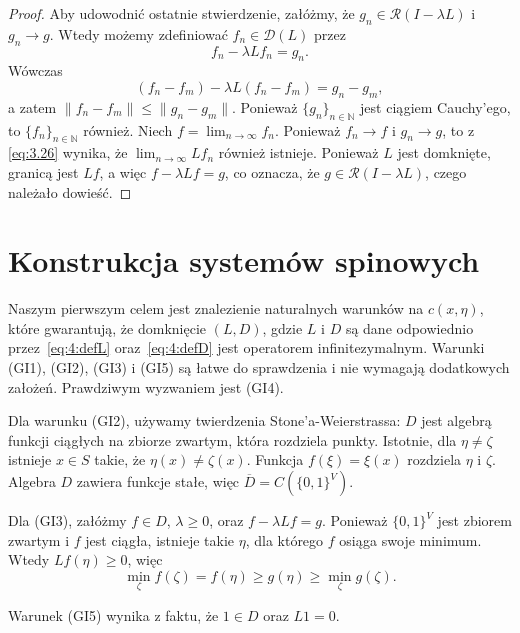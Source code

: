 \documentclass{article}
\begin{document}
\begin{proof}
	Aby udowodnić ostatnie stwierdzenie, załóżmy, że 
	$g_n \in \mathcal{R}(I - \lambda L)$ i $g_n \to g$. 
	Wtedy możemy zdefiniować $f_n \in \mathcal{D}(L)$ przez
	\begin{equation}\label{eq:3.26}
		f_n - \lambda L f_n = g_n.
	\end{equation}
	Wówczas
	\[
		(f_n - f_m) - \lambda L (f_n - f_m) = g_n - g_m,
	\]
	a zatem $\| f_n - f_m \| \leq \| g_n - g_m \|$. 
	Ponieważ $\{g_n\}_{n \in \mathbb{N}}$ jest ciągiem Cauchy’ego, 
	to $\{f_n\}_{n \in \mathbb{N}}$ również. 
	Niech $f = \lim_{n \to \infty} f_n$. 
	Ponieważ $f_n \to f$ i $g_n \to g$, to z \eqref{eq:3.26} wynika, 
	że $\lim_{n \to \infty} L f_n$ również istnieje. 
	Ponieważ $L$ jest domknięte, granicą jest $L f$, a więc $f - \lambda L f = g$, 
	co oznacza, że $g \in \mathcal{R}(I - \lambda L)$, czego należało dowieść.
\end{proof}




\section{Konstrukcja systemów spinowych}

	Naszym pierwszym celem jest znalezienie naturalnych warunków na $c(x, \eta)$, 
	które gwarantują, że domknięcie $(L,D)$, gdzie $L$ i $D$ są dane odpowiednio
	przez~\eqref{eq:4:defL} oraz~\eqref{eq:4:defD} jest operatorem infinitezymalnym. 
	Warunki (GI1), (GI2), (GI3) i (GI5) są łatwe do sprawdzenia i nie wymagają dodatkowych 
	założeń. Prawdziwym wyzwaniem jest (GI4).

	Dla warunku (GI2), używamy twierdzenia Stone’a-Weierstrassa: 
	$D$ jest algebrą funkcji ciągłych na zbiorze zwartym, 
	która rozdziela punkty. Istotnie, dla $\eta \neq \zeta$ istnieje $x \in S$ takie, 
	że $\eta(x) \neq \zeta(x)$. Funkcja $f(\xi) = \xi(x)$ rozdziela 
	$\eta$ i $\zeta$. Algebra $D$ zawiera funkcje stałe, 
	więc $\overline{D} = C(\{0,1\}^V)$. 

	Dla (GI3), załóżmy $f \in D$, $\lambda \geq 0$, oraz $f - \lambda Lf = g$. 
	Ponieważ $\{0,1\}^V$ jest zbiorem zwartym i $f$ jest ciągła, 
	istnieje takie $\eta$, dla którego $f$ osiąga swoje minimum. 
	Wtedy $Lf(\eta) \geq 0$, więc
	\[
		\min_\zeta f(\zeta) 
		= f(\eta) \geq g(\eta) 
		\geq \min_\zeta g(\zeta).
	\]

	Warunek (GI5) wynika z faktu, że $1 \in D$ oraz $L1 = 0$.
\end{document}
